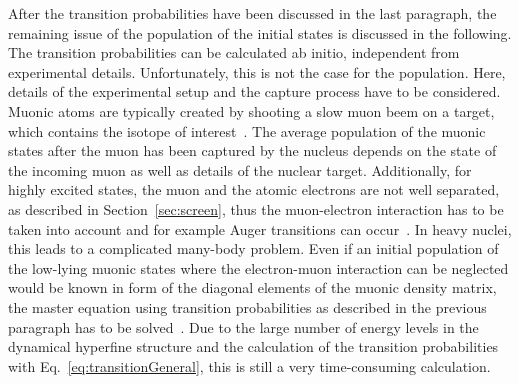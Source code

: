 After the transition probabilities have been discussed in the last paragraph, the remaining issue of the population of the initial states is discussed in the following.
The transition probabilities can be calculated ab initio, independent from experimental details. Unfortunately, this is not the case for the population. Here, details of the experimental setup and the capture process have to be considered. Muonic atoms are typically created by shooting a slow muon beem on a target, which contains the isotope of interest~\cite{wu1969,Devons1995,BorieRinker1982}. The average population of the muonic states after the muon has been captured by the nucleus depends on the state of the incoming muon as well as details of the nuclear target. Additionally, for highly excited states, the muon and the atomic electrons are not well separated, as described in Section~\ref{sec:screen}, thus the muon-electron interaction has to be taken into account and for example Auger transitions can occur~\cite{pisano1982}. In heavy nuclei, this leads to a complicated many-body problem. Even if an initial population of the low-lying muonic states where the electron-muon interaction can be neglected would be known in form of the diagonal elements of the muonic density matrix, the master equation using transition probabilities as described in the previous paragraph has to be solved~\cite{pisano1982}. Due to the large number of energy levels in the dynamical hyperfine structure and the calculation of the transition probabilities with Eq.~\eqref{eq:transitionGeneral}, this is still a very time-consuming calculation.

